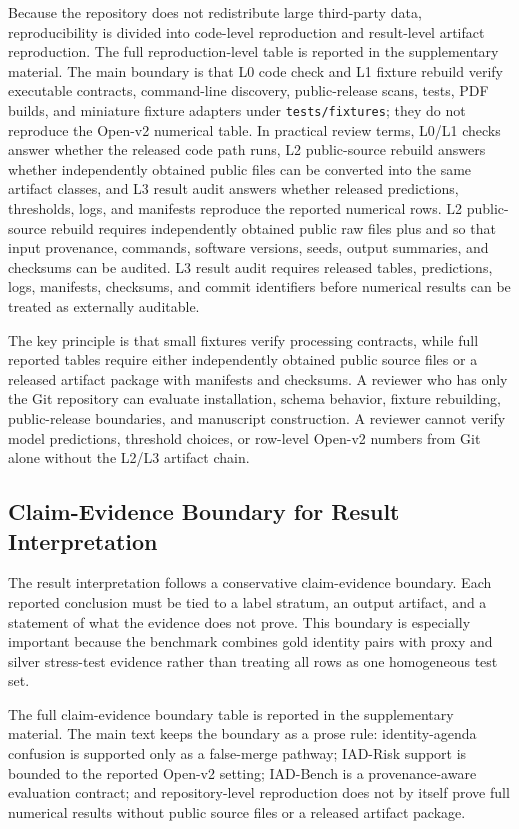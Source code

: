 \documentclass[11pt]{article}
\begin{document}
Because the repository does not redistribute large third-party data, reproducibility is divided into code-level reproduction and result-level artifact reproduction. The full reproduction-level table is reported in the supplementary material. The main boundary is that L0 code check and L1 fixture rebuild verify executable contracts, command-line discovery, public-release scans, tests, PDF builds, and miniature fixture adapters under \texttt{tests/fixtures}; they do not reproduce the Open-v2 numerical table. In practical review terms, L0/L1 checks answer whether the released code path runs, L2 public-source rebuild answers whether independently obtained public files can be converted into the same artifact classes, and L3 result audit answers whether released predictions, thresholds, logs, and manifests reproduce the reported numerical rows. L2 public-source rebuild requires independently obtained public raw files plus  and  so that input provenance, commands, software versions, seeds, output summaries, and checksums can be audited. L3 result audit requires released tables, predictions, logs, manifests, checksums, and commit identifiers before numerical results can be treated as externally auditable.

The key principle is that small fixtures verify processing contracts, while full reported tables require either independently obtained public source files or a released artifact package with manifests and checksums. A reviewer who has only the Git repository can evaluate installation, schema behavior, fixture rebuilding, public-release boundaries, and manuscript construction. A reviewer cannot verify model predictions, threshold choices, or row-level Open-v2 numbers from Git alone without the L2/L3 artifact chain.

\subsection{Claim-Evidence Boundary for Result Interpretation}

The result interpretation follows a conservative claim-evidence boundary. Each reported conclusion must be tied to a label stratum, an output artifact, and a statement of what the evidence does not prove. This boundary is especially important because the benchmark combines gold identity pairs with proxy and silver stress-test evidence rather than treating all rows as one homogeneous test set.

The full claim-evidence boundary table is reported in the supplementary material. The main text keeps the boundary as a prose rule: identity-agenda confusion is supported only as a false-merge pathway; IAD-Risk support is bounded to the reported Open-v2 setting; IAD-Bench is a provenance-aware evaluation contract; and repository-level reproduction does not by itself prove full numerical results without public source files or a released artifact package.
\end{document}
